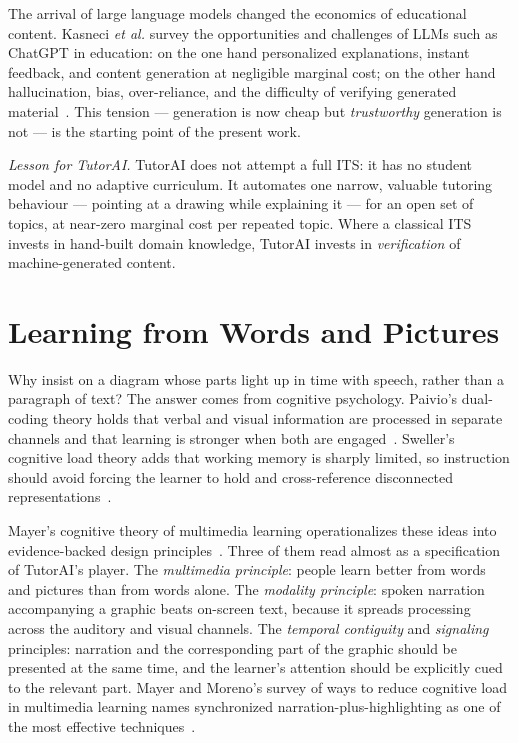 The arrival of large language models changed the economics of educational
content. Kasneci \emph{et al.} survey the opportunities and challenges of
LLMs such as ChatGPT in education: on the one hand personalized explanations,
instant feedback, and content generation at negligible marginal cost; on the
other hand hallucination, bias, over-reliance, and the difficulty of
verifying generated material~\cite{kasneci2023chatgpt}. This tension ---
generation is now cheap but \emph{trustworthy} generation is not --- is the
starting point of the present work.

\emph{Lesson for TutorAI.} TutorAI does not attempt a full ITS: it has no
student model and no adaptive curriculum. It automates one narrow, valuable
tutoring behaviour --- pointing at a drawing while explaining it --- for an
open set of topics, at near-zero marginal cost per repeated topic. Where a
classical ITS invests in hand-built domain knowledge, TutorAI invests in
\emph{verification} of machine-generated content.

\section{Learning from Words and Pictures}

Why insist on a diagram whose parts light up in time with speech, rather than
a paragraph of text? The answer comes from cognitive psychology. Paivio's
dual-coding theory holds that verbal and visual information are processed in
separate channels and that learning is stronger when both are
engaged~\cite{paivio1991}. Sweller's cognitive load theory adds that working
memory is sharply limited, so instruction should avoid forcing the learner to
hold and cross-reference disconnected representations~\cite{sweller1988}.

Mayer's cognitive theory of multimedia learning operationalizes these ideas
into evidence-backed design principles~\cite{mayer2014multimedia}. Three of
them read almost as a specification of TutorAI's player. The
\emph{multimedia principle}: people learn better from words and pictures than
from words alone. The \emph{modality principle}: spoken narration
accompanying a graphic beats on-screen text, because it spreads processing
across the auditory and visual channels. The \emph{temporal contiguity} and
\emph{signaling} principles: narration and the corresponding part of the
graphic should be presented at the same time, and the learner's attention
should be explicitly cued to the relevant part. Mayer and Moreno's survey of
ways to reduce cognitive load in multimedia learning names synchronized
narration-plus-highlighting as one of the most effective
techniques~\cite{mayermoreno2003}.


